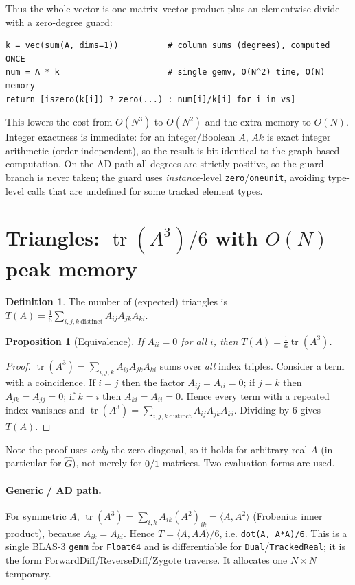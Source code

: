 \documentclass[11pt]{article}
\theoremstyle{plain}
\newtheorem{proposition}{Proposition}
\theoremstyle{definition}
\newtheorem{definition}{Definition}
\newcommand{\tr}{\operatorname{tr}}
\newcommand{\Ghat}{\hat{G}}
\begin{document}
Thus the whole vector is one matrix--vector product plus an elementwise divide with a zero-degree guard:
\begin{lstlisting}
k = vec(sum(A, dims=1))          # column sums (degrees), computed ONCE
num = A * k                      # single gemv, O(N^2) time, O(N) memory
return [iszero(k[i]) ? zero(...) : num[i]/k[i] for i in vs]
\end{lstlisting}
This lowers the cost from $O(N^3)$ to $O(N^2)$ and the extra memory to $O(N)$. Integer exactness is immediate:
for an integer/Boolean $A$, $Ak$ is exact integer arithmetic (order-independent), so the result is
bit-identical to the graph-based computation. On the AD path all degrees are strictly positive, so the guard
branch is never taken; the guard uses \emph{instance}-level \texttt{zero}/\texttt{oneunit}, avoiding
type-level calls that are undefined for some tracked element types.

\section{Triangles: $\tr(A^3)/6$ with $O(N)$ peak memory}
\label{sec:triangles}

\begin{definition}
The number of (expected) triangles is
$T(A)=\tfrac16\sum_{i,j,k\ \text{distinct}} A_{ij}A_{jk}A_{ki}$.
\end{definition}

\begin{proposition}[Equivalence]\label{prop:tri}
If $A_{ii}=0$ for all $i$, then $T(A)=\tfrac16\tr(A^3)$.
\end{proposition}
\begin{proof}
$\tr(A^3)=\sum_{i,j,k}A_{ij}A_{jk}A_{ki}$ sums over \emph{all} index triples. Consider a term with a
coincidence. If $i=j$ then the factor $A_{ij}=A_{ii}=0$; if $j=k$ then $A_{jk}=A_{jj}=0$; if $k=i$ then
$A_{ki}=A_{ii}=0$. Hence every term with a repeated index vanishes and
$\tr(A^3)=\sum_{i,j,k\ \text{distinct}}A_{ij}A_{jk}A_{ki}$. Dividing by $6$ gives $T(A)$.
\end{proof}

Note the proof uses \emph{only} the zero diagonal, so it holds for arbitrary real $A$ (in particular for
$\Ghat$), not merely for $0/1$ matrices. Two evaluation forms are used.

\paragraph{Generic / AD path.} For symmetric $A$, $\tr(A^3)=\sum_{i,k}A_{ik}(A^2)_{ik}=\langle A,A^2\rangle$
(Frobenius inner product), because $A_{ik}=A_{ki}$. Hence $T=\langle A,A A\rangle/6$, i.e.
\texttt{dot(A, A*A)/6}. This is a single BLAS-3 \texttt{gemm} for \texttt{Float64} and is differentiable for
\texttt{Dual}/\texttt{TrackedReal}; it is the form ForwardDiff/ReverseDiff/Zygote traverse. It allocates one
$N\times N$ temporary.
\end{document}
